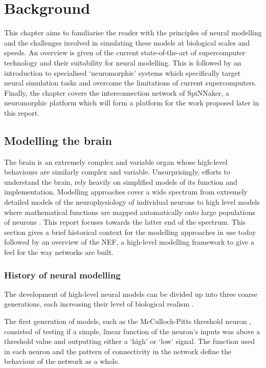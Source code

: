 \chapter{Background}
	
	\label{sec:background}
	
	This chapter aims to familiarise the reader with the principles of neural
	modelling and the challenges involved in simulating these models at biological
	scales and speeds. An overview is given of the current state-of-the-art of
	supercomputer technology and their suitability for neural modelling. This is
	followed by an introduction to specialised `neuromorphic' systems which
	specifically target neural simulation tasks and overcome the limitations of
	current supercomputers. Finally, the chapter covers the interconnection
	network of SpiNNaker, a neuromorphic platform which will form a platform for
	the work proposed later in this report.
	
	\section{Modelling the brain}
		
		
		The brain is an extremely complex and variable organ whose high-level
		behaviours are similarly complex and variable. Unsurprisingly, efforts to
		understand the brain, rely heavily on simplified models of its function and
		implementation. Modelling approaches cover a wide spectrum from extremely
		detailed models of the neurophysiology of individual neurons
		\cite{carnevale06} to high level models where mathematical functions are
		mapped automatically onto large populations of neurons \cite{eliasmith04}.
		This report focuses towards the latter end of the spectrum. This section
		gives a brief historical context for the modelling approaches in use today
		followed by an overview of the NEF, a high-level modelling framework to give
		a feel for the way networks are built.
		
		\subsection{History of neural modelling}
			
			The development of high-level neural models can be divided up into three
			coarse generations, each increasing their level of biological realism
			\cite{vainbrand11}.
			
			The first generation of models, such as the McCulloch-Pitts threshold neuron
			\cite{mcculloch43}, consisted of testing if a simple, linear function of
			the neuron's inputs was above a threshold value and outputting either a
			`high' or `low' signal. The function used in each neuron and the pattern
			of connectivity in the network define the behaviour of the network as a
			whole.
			
